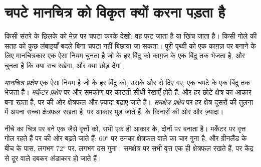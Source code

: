 \section{चपटे मानचित्र को विकृत क्यों करना पड़ता है}

किसी संतरे के छिलके को मेज़ पर चपटा करके देखो: वह फट जाता है या खिंच जाता है। किसी गोले की
सतह को कुछ लंबाइयाँ बदले बिना चपटा नहीं बिछाया जा सकता। पूरी पृथ्वी को एक काग़ज़ पर बनाने के
लिए मानचित्रकार एक ऐसा नियम चुनता है जो  के हर बिंदु को काग़ज़ के एक बिंदु तक भेजता है,
और चुनता है कि  क्या सच रखेगा, और क्या छोड़
देगा।

\begin{definition}[मानचित्र प्रक्षेप]\label{def:g9:maps-of-the-earth:projection}
\emph{मानचित्र प्रक्षेप} एक ऐसा नियम है जो  के हर बिंदु को,
उसके  और  से दिए गए, एक चपटे  के एक बिंदु तक भेजता है।
\emph{मर्केटर प्रक्षेप} पर  और  समकोण पर
काटती सीधी रेखाएँ होते हैं, और हर छोटे क्षेत्र का आकार बना रहता है, पर  की ओर क्षेत्रफल
और ज़्यादा बढ़ाए जाते हैं। \emph{समक्षेत्र
प्रक्षेप} पर हर क्षेत्र दूसरों की तुलना में अपना सच्चा क्षेत्रफल
रखता है, पर आकार मुड़ जाते हैं,  के किनारों की ओर और
ज़्यादा।
\end{definition}

नीचे का चित्र  पर बने एक जैसे वृत्तों को, सभी एक ही आकार के, दोनों  पर
बनाता है। मर्केटर  पर वृत्त गोल रहते हैं पर  की ओर बढ़ते जाते हैं: 
\ang{60} पर उनका क्षेत्रफल  वाले का चार गुना है, और ग्रीनलैंड के बीच के पास,
लगभग \ang{72} पर, लगभग दस गुना। समक्षेत्र  पर सभी वृत्त एक ही क्षेत्रफल रखते हैं,
पर केंद्र से दूर वाले दबकर अंडाकार हो जाते हैं।

